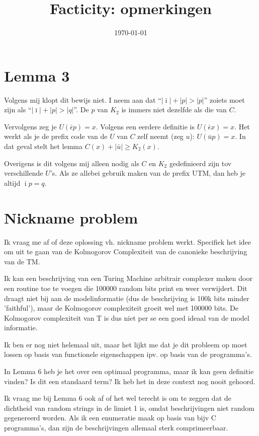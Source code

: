 \documentclass{article}
\title{Facticity: opmerkingen}
\date{\today}
\theoremstyle{definition}
\begin{document}
\maketitle

\section{Lemma 3}

Volgens mij klopt dit bewijs niet. I neem aan dat ``$|\bar{\imath}| + |p| > |p|$'' zoiets moet zijn als ``$|\bar{\imath}| + |p| > |q|$''. De $p$ van $K_2$ is immers niet dezelfde als die van $C$. 

Vervolgens zeg je $U(\bar{\epsilon}p) = x$. Volgens een eerdere definitie is $U(\bar{\epsilon}x) = x$. Het werkt als je de prefix code van de $U$ van $C$ zelf neemt (zeg $u$): $U(\bar{u}p) = x$. In dat geval stelt het lemma $C(x) + |\bar{u}| \geq K_2(x)$. 

Overigens is dit volgens mij alleen nodig als $C$ en $K_2$ gedefinieerd zijn tov verschillende $U$'s. Als ze allebei gebruik maken van de prefix UTM, dan heb je altijd $\bar{\imath}p = q$.

\section{Nickname problem}

Ik vraag me af of deze oplossing vh. nickname problem werkt. Specifiek het idee om uit te gaan van de Kolmogorov Complexiteit van de canonieke beschrijving van de TM. 

Ik kan een beschrijving van een Turing Machine arbitrair complexer maken door een routine toe te voegen die 100000 random bits print en weer verwijdert. Dit draagt niet bij aan de modelinformatie (dus de beschrijving is 100k bits minder 'faithful'), maar de Kolmogorov complexiteit groeit wel met 100000 bits. De Kolmogorov complexiteit van T is dus niet per se een goed ideaal van de model informatie. 

Ik ben er nog niet helemaal uit, maar het lijkt me dat je dit probleem op moet lossen op basis van functionele eigenschappen ipv. op basis van de programma's.

In Lemma 6 heb je het over een optimaal programma, maar ik kan geen definitie vinden? Is dit een standaard term? Ik heb het in deze context nog nooit gehoord. 

Ik vraag me bij Lemma 6 ook af of het wel terecht is om te zeggen dat de dichtheid van random strings in de limiet 1 is, omdat beschrijvingen niet random gegenereerd worden. Als ik een enumeratie maak op basis van bijv C programma's, dan zijn de beschrijvingen allemaal sterk comprimeerbaar.
\end{document}

